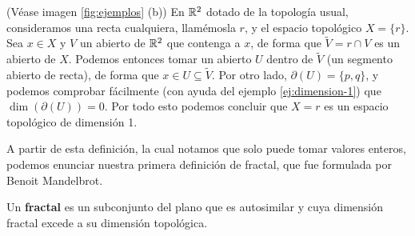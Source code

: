 \begin{ejemplo}
(Véase imagen \ref{fig:ejemplos} (b))
En $\mathbb{R}^2$ dotado de la topología usual, consideramos una recta cualquiera, llamémosla $r$, y el espacio topológico $X=\{r\}$. Sea $x\in X$ y $V$ un abierto de $\mathbb{R}^2$ que contenga a $x$, de forma que $\tilde{V} = r\cap V$ es un abierto de $X$. Podemos entonces tomar un abierto $U$ dentro de $\tilde{V}$ (un segmento abierto de recta), de forma que $x\in U\subseteq \tilde{V}$. Por otro lado, $\partial(U)=\{p,q\}$, y podemos comprobar fácilmente (con ayuda del ejemplo \ref{ej:dimension-1}) que $\dim(\partial(U))=0$. Por todo esto podemos concluir que $X=r$ es un espacio topológico de dimensión 1. 
\end{ejemplo}

A partir de esta definición, la cual notamos que solo puede tomar valores enteros, podemos enunciar nuestra primera definición de fractal, que fue formulada por Benoit Mandelbrot.

\begin{definicion}[Fractal]
\label{def:fractal}
Un \textbf{fractal} es un subconjunto del plano que es autosimilar y cuya dimensión fractal excede a su dimensión topológica.
\end{definicion}
